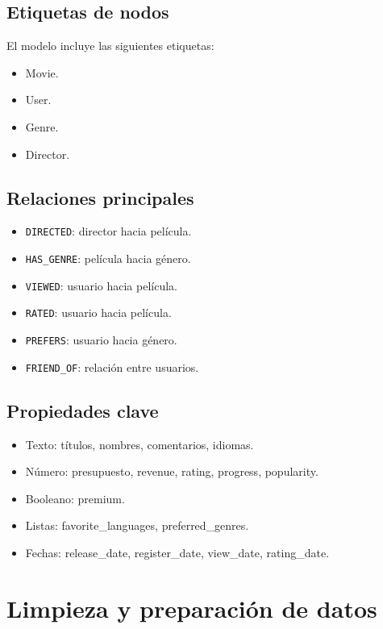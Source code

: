 \documentclass[12pt,a4paper]{article}
\begin{document}
\subsection{Etiquetas de nodos}

El modelo incluye las siguientes etiquetas:

\begin{itemize}
    \item Movie.
    \item User.
    \item Genre.
    \item Director.
\end{itemize}

\subsection{Relaciones principales}

\begin{itemize}
    \item \texttt{DIRECTED}: director hacia película.
    \item \texttt{HAS\_GENRE}: película hacia género.
    \item \texttt{VIEWED}: usuario hacia película.
    \item \texttt{RATED}: usuario hacia película.
    \item \texttt{PREFERS}: usuario hacia género.
    \item \texttt{FRIEND\_OF}: relación entre usuarios.
\end{itemize}

\subsection{Propiedades clave}

\begin{itemize}
    \item Texto: títulos, nombres, comentarios, idiomas.
    \item Número: presupuesto, revenue, rating, progress, popularity.
    \item Booleano: premium.
    \item Listas: favorite\_languages, preferred\_genres.
    \item Fechas: release\_date, register\_date, view\_date, rating\_date.
\end{itemize}

\section{Limpieza y preparación de datos}
\end{document}
